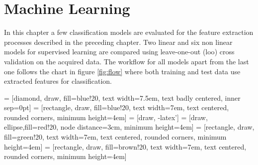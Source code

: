 \chapter{Machine Learning}

In this chapter a few classification models are evaluated for the feature extraction processes described in the preceding chapter. Two linear and six non linear models for supervised learning are compared using leave-one-out (\gls{loo}) cross validation on the acquired data. The workflow for all models apart from the last one follows the chart in figure \ref{fig:flow} where both training and test data use extracted features for classification.

 = [diamond, draw, fill=blue!20, 
    text width=7.5em, text badly centered, inner sep=0pt]
 = [rectangle, draw, fill=blue!20, 
    text width=7em, text centered, rounded corners, minimum height=4em]
 = [draw, -latex']
 = [draw, ellipse,fill=red!20, node distance=3cm,
    minimum height=4em]
 = [rectangle, draw, fill=green!20, 
    text width=7em, text centered, rounded corners, minimum height=4em]
 = [rectangle, draw, fill=brown!20, 
    text width=7em, text centered, rounded corners, minimum height=4em]

